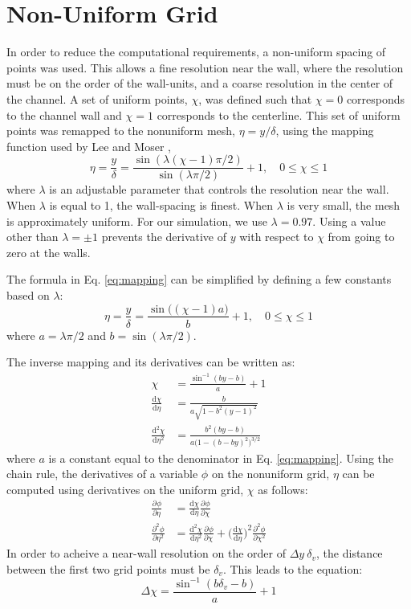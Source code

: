\documentclass[a4paper,11pt]{article}
\newcommand{\pderiv}[3][]{%
  \ensuremath{\frac{\partial^{#1} {#2}}{\partial {#3}^{#1}}}}
\begin{document}
\section{Non-Uniform Grid}
In order to reduce the computational requirements, a non-uniform spacing of points was used.  This allows a fine resolution near the wall, where the resolution must be on the order of the wall-units, and a coarse resolution in the center of the channel.  A set of uniform points, $\chi$, was defined such that $\chi=0$ corresponds to the channel wall and $\chi=1$ corresponds to the centerline.  This set of uniform points was remapped to the nonuniform mesh, $\eta = y/\delta$, using the mapping function used by Lee and Moser \cite{Lee},
\begin{equation} \label{eq:mapping}
 \eta = \frac{y}{\delta} = \frac{\sin(\lambda (\chi-1) \pi/2)}{\sin(\lambda \pi/2)}+1, \quad 0 \le \chi \le 1
\end{equation}
where $\lambda$ is an adjustable parameter that controls the resolution near the
wall. When $\lambda$ is equal to 1, the wall-spacing is finest.  When $\lambda$
is very small, the mesh is approximately uniform.  For our simulation, we use
$\lambda = 0.97$.  Using a value other than $\lambda = \pm 1$ prevents the
derivative of $y$ with respect to $\chi$ from going to zero at the walls.

The formula in Eq. \ref{eq:mapping} can be simplified by defining a few
constants based on $\lambda$:
\begin{equation}
 \eta = \frac{y}{\delta} = \frac{\sin\big((\chi-1)a\big)}{b}+1, \quad 0 \le \chi \le 1
\end{equation}
where $a = \lambda \pi/2$ and $b = \sin (\lambda \pi/2)$.

The inverse mapping and its derivatives can be written as:
\begin{align}
  \chi &= \frac{\sin^{-1}(by-b)}{a} + 1 \\
  \frac{\mathrm{d}\chi}{\mathrm{d}\eta} &= \frac{b}{a \sqrt{1-b^2(y-1)^2}} \label{eq:chi-y-1} \\
  \frac{\mathrm{d}^2\chi}{\mathrm{d}\eta^2} &= \frac{b^2(by-b)}{a\big(1-(b-by)^2\big)^{3/2}} \label{eq:chi-y-2}
\end{align}
where $a$ is a constant equal to the denominator in Eq. \ref{eq:mapping}.  Using the chain rule, the derivatives of a variable $\phi$ on the nonuniform grid, $\eta$ can be computed using derivatives on the uniform grid, $\chi$ as follows:
\begin{align}
 \pderiv{\phi}{\eta} &= \frac{\mathrm{d}\chi}{\mathrm{d}\eta} \pderiv{\phi}{\chi} \label{eq:phi-y-1} \\
 \pderiv[2]{\phi}{\eta} &= \frac{\mathrm{d}^2\chi}{\mathrm{d}\eta^2} \pderiv{\phi}{\chi} + \Big(\frac{\mathrm{d}\chi}{\mathrm{d}\eta} \Big)^2 \pderiv[2]{\phi}{\chi}  \label{eq:phi-y-2} 
\end{align}
In order to acheive a near-wall resolution on the order of $\Delta y ~ \delta_v$, the distance between the first two grid points must be $\delta_v$.  This leads to the equation:
\begin{equation}
 \Delta \chi = \frac{\sin^{-1}(b\delta_v -b)}{a}+1
\end{equation}
\end{document}
